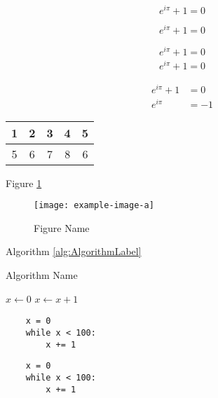 \documentclass{labreport}
\begin{document}
\begin{equation}
    e^{i\pi}+1=0
\end{equation}

\begin{equation*}
    e^{i\pi}+1=0
\end{equation*}

\begin{gather}
    e^{i\pi}+1=0 \\
    e^{i\pi}+1=0
\end{gather}

\begin{align}
    e^{i\pi}+1&=0 \\
    e^{i\pi}&=-1
\end{align}

\begin{center}
\begin{tabular}{|c|c|c|c|c|} 
    \hline
    1 & 2 & 3 & 4 & 5 \\ \hline
    5 & 6 & 7 & 8 & 6 \\ \hline
\end{tabular}
\end{center}

Figure \ref{fig:FigureLabel}

\begin{figure}[h]
    \centering\texttt{[image: example-image-a]}
    \caption{Figure Name}\label{fig:FigureLabel}
\end{figure}

Algorithm \ref{alg:AlgorithmLabel}

\begin{algorithm}
    \caption{Algorithm Name}\label{alg:AlgorithmLabel}
    \begin{algorithmic}
        \State $x \gets 0$
            \State $x \gets x + 1$
        \EndWhile
    \end{algorithmic}
\end{algorithm}

\begin{verbatim}
    x = 0
    while x < 100:
        x += 1
\end{verbatim}

\lstset{language=Python}
\begin{lstlisting}
    x = 0
    while x < 100:
        x += 1
\end{lstlisting}
\end{document}
